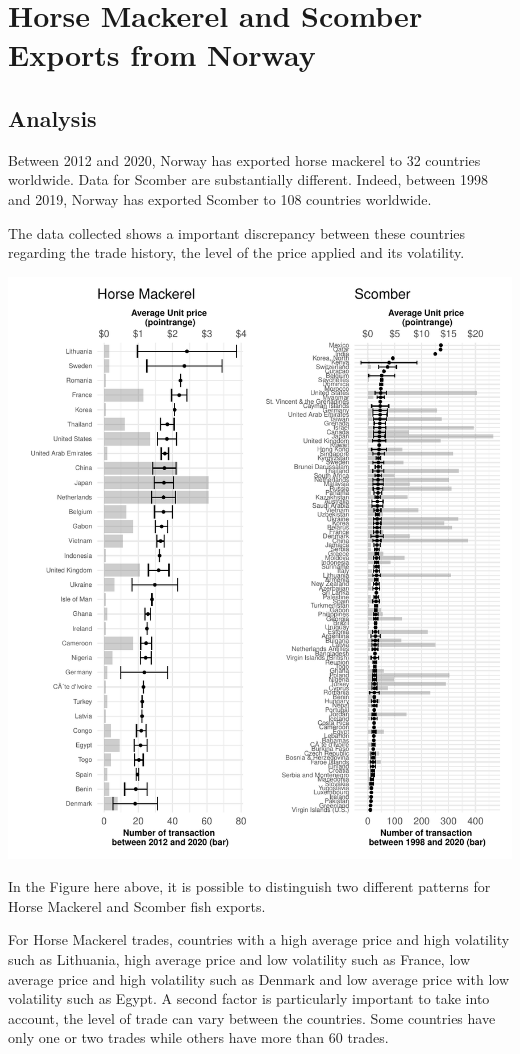 \documentclass[10,a4paperpaper,]{article}
\begin{document}
\section{Horse Mackerel and Scomber Exports from Norway}

\subsection{Analysis}

Between 2012 and 2020, Norway has exported horse mackerel to 32
countries worldwide. Data for Scomber are substantially different.
Indeed, between 1998 and 2019, Norway has exported Scomber to 108
countries worldwide.

The data collected shows a important discrepancy between these countries
regarding the trade history, the level of the price applied and its
volatility.

\includegraphics{report_files/figure-latex/unnamed-chunk-1-1.pdf}

In the Figure here above, it is possible to distinguish two different
patterns for Horse Mackerel and Scomber fish exports.

For Horse Mackerel trades, countries with a high average price and high
volatility such as Lithuania, high average price and low volatility such
as France, low average price and high volatility such as Denmark and low
average price with low volatility such as Egypt. A second factor is
particularly important to take into account, the level of trade can vary
between the countries. Some countries have only one or two trades while
others have more than 60 trades.
\end{document}
